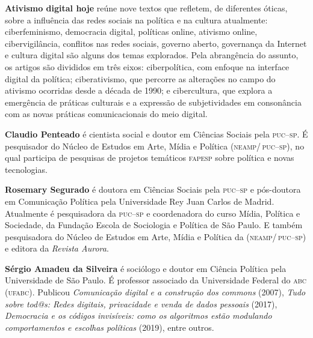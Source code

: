 \textbf{Ativismo digital hoje} reúne nove textos que refletem, de diferentes óticas, sobre a influência das redes sociais na política e na cultura atualmente: ciberfeminismo, democracia digital, políticas online, ativismo online, cibervigilância, conflitos nas redes sociais, governo aberto, governança da Internet e cultura digital são alguns dos temas explorados.
Pela abrangência do assunto, os artigos são divididos em três eixos: ciberpolítica, com enfoque na interface digital da política; ciberativismo, que percorre as alterações no campo do ativismo ocorridas desde a década de 1990; e cibercultura, que explora a emergência de práticas culturais e a expressão de subjetividades em consonância com as novas práticas comunicacionais do meio digital.

\textbf{Claudio Penteado} é cientista social e doutor em Ciências Sociais pela \textsc{puc--sp}. É pesquisador do Núcleo de Estudos em Arte, Mídia e Política (\textsc{neamp/\,puc--sp}), no qual participa de pesquisas de projetos temáticos \textsc{fapesp} sobre política e novas tecnologias.

\textbf{Rosemary Segurado} é doutora em Ciências Sociais pela \textsc{puc--sp} e pós-doutora em Comunicação Política pela Universidade Rey Juan Carlos de Madrid. Atualmente é pesquisadora da \textsc{puc--sp} e coordenadora do curso Mídia, Política e Sociedade, da Fundação Escola de Sociologia e Política de São Paulo. 
E também pesquisadora do Núcleo de Estudos em Arte, Mídia e Política da (\textsc{neamp/\,puc--sp}) e editora da \textit{Revista Aurora}.

\textbf{Sérgio Amadeu da Silveira} é sociólogo e doutor em Ciência Política pela Universidade de São Paulo. É professor associado da Universidade Federal do \textsc{abc} (\textsc{ufabc}). Publicou \textit{Comunicação digital e a construção dos commons} (2007), \textit{Tudo sobre tod@s: Redes digitais, privacidade e venda de dados pessoais} (2017), \textit{Democracia e os códigos invisíveis: como os algoritmos estão modulando comportamentos e escolhas políticas} (2019), entre outros.

